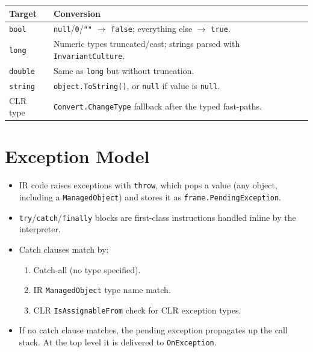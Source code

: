 \documentclass[11pt,a4paper]{article}
\begin{document}
\begin{center}
\begin{tabular}{lp{9cm}}
\toprule
\textbf{Target} & \textbf{Conversion} \\
\midrule
\texttt{bool}   & \texttt{null}/\texttt{0}/\texttt{""} $\to$ \texttt{false}; everything else $\to$ \texttt{true}. \\
\texttt{long}   & Numeric types truncated/cast; strings parsed with \texttt{InvariantCulture}. \\
\texttt{double} & Same as \texttt{long} but without truncation. \\
\texttt{string} & \texttt{object.ToString()}, or \texttt{null} if value is \texttt{null}. \\
CLR type        & \texttt{Convert.ChangeType} fallback after the typed fast-paths. \\
\bottomrule
\end{tabular}
\end{center}

\section{Exception Model}

\begin{itemize}
  \item IR code raises exceptions with \texttt{throw}, which pops a value
        (any object, including a \texttt{ManagedObject}) and stores it as
        \texttt{frame.PendingException}.
  \item \texttt{try}/\texttt{catch}/\texttt{finally} blocks are first-class
        instructions handled inline by the interpreter.
  \item Catch clauses match by:
        \begin{enumerate}
          \item Catch-all (no type specified).
          \item IR \texttt{ManagedObject} type name match.
          \item CLR \texttt{IsAssignableFrom} check for CLR exception types.
        \end{enumerate}
  \item If no catch clause matches, the pending exception propagates up the
        call stack.  At the top level it is delivered to \texttt{OnException}.
\end{itemize}
\end{document}
